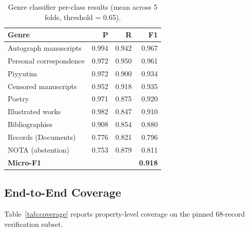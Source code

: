 \documentclass[Afour,sageh,times]{sagej}
\begin{document}
\begin{table}[t]
\caption{Genre classifier per-class results (mean across 5 folds, threshold = 0.65).}
\label{tab:genre-perclass}
\centering
\small
\begin{tabular}{lrrr}
\toprule
\textbf{Genre} & \textbf{P} & \textbf{R} & \textbf{F1} \\
\midrule
Autograph manuscripts      & 0.994 & 0.942 & 0.967 \\
Personal correspondence    & 0.972 & 0.950 & 0.961 \\
Piyyutim                   & 0.972 & 0.900 & 0.934 \\
Censored manuscripts       & 0.952 & 0.918 & 0.935 \\
Poetry                     & 0.971 & 0.875 & 0.920 \\
Illustrated works          & 0.982 & 0.847 & 0.910 \\
Bibliographies             & 0.908 & 0.854 & 0.880 \\
Records (Documents)        & 0.776 & 0.821 & 0.796 \\
\midrule
NOTA (abstention)          & 0.753 & 0.879 & 0.811 \\
\midrule
\textbf{Micro-F1}          &       &       & \textbf{0.918} \\
\bottomrule
\end{tabular}
\end{table}

\subsection{End-to-End Coverage}

Table~\ref{tab:coverage} reports property-level coverage on the pinned 68-record verification subset.
\end{document}

